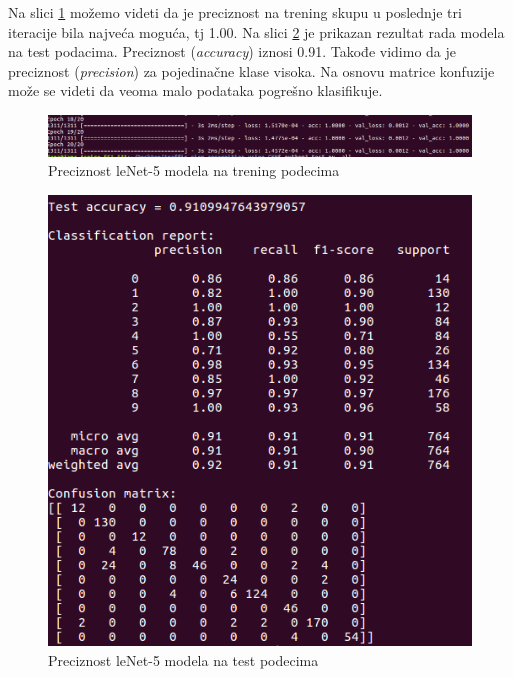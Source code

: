 \documentclass[a4paper]{article}
\begin{document}
Na slici \ref{fig:leNet_trening_acc} možemo videti da je preciznost na trening skupu u poslednje tri iteracije bila najveća moguća, tj 1.00. Na slici \ref{fig:leNet_test_acc} je prikazan rezultat rada modela na test podacima. Preciznost (\textit{accuracy}) iznosi 0.91. Takođe vidimo da je preciznost (\textit{precision}) za pojedinačne klase visoka. Na osnovu matrice konfuzije može se videti da veoma malo podataka pogrešno klasifikuje.


\begin{figure}[h!]
\begin{center}
\includegraphics[scale=0.35]{leNet_trening_acc.png}
\end{center}
\caption{Preciznost leNet-5 modela na trening podecima}
\label{fig:leNet_trening_acc}
\end{figure}

\begin{figure}[h!]
\begin{center}
\includegraphics[scale=0.40]{leNet_test_acc.png}
\end{center}
\caption{Preciznost leNet-5 modela na test podecima}
\label{fig:leNet_test_acc}
\end{figure}
\end{document}
